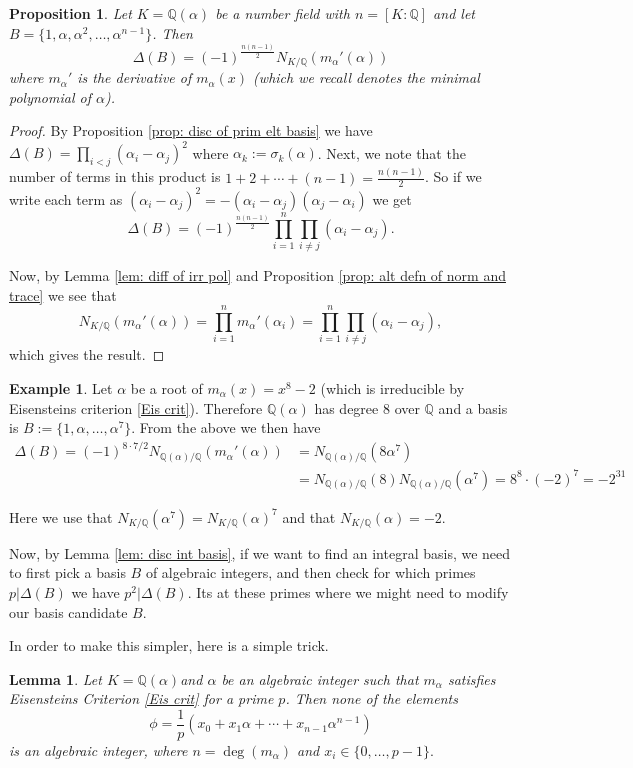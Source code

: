 \documentclass[11pt,a4paper]{report}
\theoremstyle{plain}
\newtheorem{lem}[subsection]{Lemma}
\newtheorem{prop}[subsection]{Proposition}
\theoremstyle{definition}
\newtheorem{exmp}[subsection]{Example}
\theoremstyle{definition}
\def\QQ{\mathbb{Q}}
\def \a{\alpha}
\begin{document}
	
	\begin{prop}\label{prop: num field disc in terms of norm}
		Let $K=\QQ(\a)$ be a number field with $n=[K:\QQ]$ and let $B=\{1,\a,\a^2,\dots,\a^{n-1}\}$. Then \[\Delta(B)=(-1)^{\frac{n(n-1)}{2}}N_{K/\QQ}(m_\a'(\a))\] where $m_\a'$ is the derivative of $m_\a(x)$ (which we recall denotes the minimal polynomial of $\a$).
		
	\end{prop}
	\begin{proof}
		By Proposition \ref{prop: disc of prim elt basis} we have $\Delta(B)=\prod_{i < j}(\a_i-\a_j)^2$ where $\a_k:=\sigma_k(\a)$. Next, we note that the number of terms in this product is $1+2+\cdots+(n-1)=\frac{n(n-1)}{2}$. So if we write each term as $(\a_i-\a_j)^2=-(\a_i-\a_j)(\a_j-\a_i)$ we get \[\Delta(B)=(-1)^{\frac{n(n-1)}{2}}\prod_{i=1}^n \prod_{i \neq j} (\a_i-\a_j). \]
		
		Now, by Lemma \ref{lem: diff of irr pol} and Proposition \ref{prop: alt defn of norm and trace} we see that \[N_{K/\QQ}(m_\a'(\a))=\prod_{i=1}^n m_\a'(\a_i)=\prod_{i=1}^n \prod_{i \neq j} (\a_i-\a_j),\] which gives the result.
		
		
	\end{proof}
	
	\begin{exmp}\label{exmp: disc of x^8-2}
		Let $\a$ be a root of $m_\a(x)=x^8-2$ (which is irreducible by Eisensteins criterion \ref{Eis crit}). Therefore $\QQ(\a)$ has degree $8$ over $\QQ$ and a basis is $B:=\{1,\a,\dots,\a^7\}$. From the above we then have \begin{align*}\Delta(B)= (-1)^{8\cdot7/2} N_{\QQ(\a)/\QQ} (m_\a'(\a))&= N_{\QQ(\a)/\QQ} (8\a^7)\\&=N_{\QQ(\a)/\QQ}(8) N_{\QQ(\a)/\QQ}(\a^7)=8^8 \cdot (-2)^7=-2^{31}\end{align*}
		
		Here we use that $N_{K/\QQ}(\a^7)=N_{K/\QQ}(\a)^7$ and that $N_{K/\QQ}(\a)=-2$. 
	\end{exmp}
	
	Now, by Lemma \ref{lem: disc int basis}, if we want to find an integral basis, we need to first pick a basis $B$ of algebraic integers, and then check for which primes $p|\Delta(B)$ we have $p^2| \Delta(B)$. Its at these primes where we might need to modify our basis candidate $B$.
	
	In order to make this simpler, here is a simple trick.
	
	\begin{lem}\label{lem: eis crit and alg ints}
		Let $K=\QQ(\a)$and $\a$ be an algebraic integer such that $m_\a$ satisfies Eisensteins Criterion \ref{Eis crit} for a prime $p$. Then none of the elements \[\phi=\frac{1}{p}(x_0+x_1\a+\cdots+x_{n-1}\a^{n-1})\] is an algebraic integer, where $n=\deg(m_\a)$ and $x_i \in \{0,\dots,p-1\}.$
	\end{lem} 
	
\end{document}
